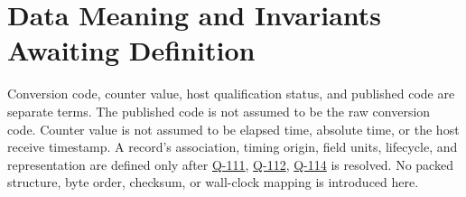\section{Data Meaning and Invariants Awaiting Definition}
Conversion code, counter value, host qualification status, and published code are separate terms. The published code is not assumed to be the raw conversion code. Counter value is not assumed to be elapsed time, absolute time, or the host receive timestamp. A record's association, timing origin, field units, lifecycle, and representation are defined only after \hyperref[Question:Q-111]{Q-111}, \hyperref[Question:Q-112]{Q-112}, \hyperref[Question:Q-114]{Q-114} is resolved. No packed structure, byte order, checksum, or wall-clock mapping is introduced here.
